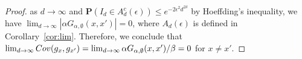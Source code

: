 \documentclass[10pt,a4paper]{amsart}
\begin{document}
\begin{proof}
  as $d\to\infty$ and
  $\mathbf{P}(I_d\in A_d^c(\epsilon))\le e^{-2\epsilon^2 d^{2\delta}}$
  by Hoeffding's inequality, we have
  $\lim_{d\to\infty}|\alpha G_{\alpha,\emptyset}(x,x')|=0$,
  where $A_d(\epsilon)$ is defined in Corollary~\ref{cor:lim}.
  Therefore, we conclude that
  $\lim_{d\to\infty}{\rm Cov}(g_x,g_{x'})=\lim_{d\to\infty}\alpha G_{\alpha,\emptyset}(x,x')/\beta=0$ for $x\neq x'$.

\end{proof}
\end{document}
